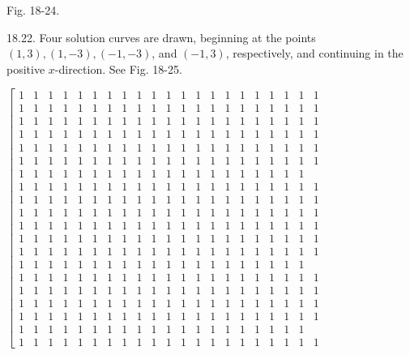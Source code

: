\documentclass[10pt]{article}
\begin{document}
Fig. 18-24.

18.22. Four solution curves are drawn, beginning at the points $(1,3),(1,-3),(-1,-3)$, and $(-1,3)$, respectively, and continuing in the positive $x$-direction. See Fig. 18-25.

$\left[\begin{array}{lllllllllllllllllllllll}\hline 1 & 1 & 1 & 1 & 1 & 1 & 1 & 1 & 1 & 1 & 1 & 1 & 1 & 1 & 1 & 1 & 1 & 1 & 1 & 1 & 1 \\ 1 & 1 & 1 & 1 & 1 & 1 & 1 & 1 & 1 & 1 & 1 & 1 & 1 & 1 & 1 & 1 & 1 & 1 & 1 & 1 & 1 \\ 1 & 1 & 1 & 1 & 1 & 1 & 1 & 1 & 1 & 1 & 1 & 1 & 1 & 1 & 1 & 1 & 1 & 1 & 1 & 1 & 1 \\ 1 & 1 & 1 & 1 & 1 & 1 & 1 & 1 & 1 & 1 & 1 & 1 & 1 & 1 & 1 & 1 & 1 & 1 & 1 & 1 & 1 \\ 1 & 1 & 1 & 1 & 1 & 1 & 1 & 1 & 1 & 1 & 1 & 1 & 1 & 1 & 1 & 1 & 1 & 1 & 1 & 1 & 1 \\ 1 & 1 & 1 & 1 & 1 & 1 & 1 & 1 & 1 & 1 & 1 & 1 & 1 & 1 & 1 & 1 & 1 & 1 & 1 & 1 & 1 \\ 1 & 1 & 1 & 1 & 1 & 1 & 1 & 1 & 1 & 1 & 1 & 1 & 1 & 1 & 1 & 1 & 1 & 1 & 1 & 1 \\ 1 & 1 & 1 & 1 & 1 & 1 & 1 & 1 & 1 & 1 & 1 & 1 & 1 & 1 & 1 & 1 & 1 & 1 & 1 & 1 & 1 \\ 1 & 1 & 1 & 1 & 1 & 1 & 1 & 1 & 1 & 1 & 1 & 1 & 1 & 1 & 1 & 1 & 1 & 1 & 1 & 1 & 1 \\ 1 & 1 & 1 & 1 & 1 & 1 & 1 & 1 & 1 & 1 & 1 & 1 & 1 & 1 & 1 & 1 & 1 & 1 & 1 & 1 & 1 \\ 1 & 1 & 1 & 1 & 1 & 1 & 1 & 1 & 1 & 1 & 1 & 1 & 1 & 1 & 1 & 1 & 1 & 1 & 1 & 1 & 1 \\ 1 & 1 & 1 & 1 & 1 & 1 & 1 & 1 & 1 & 1 & 1 & 1 & 1 & 1 & 1 & 1 & 1 & 1 & 1 & 1 & 1 \\ 1 & 1 & 1 & 1 & 1 & 1 & 1 & 1 & 1 & 1 & 1 & 1 & 1 & 1 & 1 & 1 & 1 & 1 & 1 & 1 & 1 \\ 1 & 1 & 1 & 1 & 1 & 1 & 1 & 1 & 1 & 1 & 1 & 1 & 1 & 1 & 1 & 1 & 1 & 1 & 1 & 1 \\ 1 & 1 & 1 & 1 & 1 & 1 & 1 & 1 & 1 & 1 & 1 & 1 & 1 & 1 & 1 & 1 & 1 & 1 & 1 & 1 & 1 \\ 1 & 1 & 1 & 1 & 1 & 1 & 1 & 1 & 1 & 1 & 1 & 1 & 1 & 1 & 1 & 1 & 1 & 1 & 1 & 1 & 1 \\ 1 & 1 & 1 & 1 & 1 & 1 & 1 & 1 & 1 & 1 & 1 & 1 & 1 & 1 & 1 & 1 & 1 & 1 & 1 & 1 & 1 \\ 1 & 1 & 1 & 1 & 1 & 1 & 1 & 1 & 1 & 1 & 1 & 1 & 1 & 1 & 1 & 1 & 1 & 1 & 1 & 1 & 1 \\ 1 & 1 & 1 & 1 & 1 & 1 & 1 & 1 & 1 & 1 & 1 & 1 & 1 & 1 & 1 & 1 & 1 & 1 & 1 & 1 \\ 1 & 1 & 1 & 1 & 1 & 1 & 1 & 1 & 1 & 1 & 1 & 1 & 1 & 1 & 1 & 1 & 1 & 1 & 1 & 1 & 1\end{array}\right.$
\end{document}
